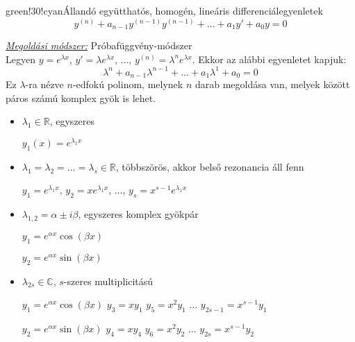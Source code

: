 \documentclass[main.tex]{subfiles}
\begin{document}
\begin{cbox}{green!30!cyan}{Állandó együtthatós, homogén, lineáris differenciálegyenletek}
  \[
    y^{(n)}
    + a_{n-1} y^{(n-1)} y^{(n-1)}
    + \dots
    + a_1 y'
    + a_0 y
    = 0
  \]

  \emph{\underline{Megoldási módszer:}} \quad Próbafüggvény-módszer
  \\[2mm]
  Legyen $y = e^{\lambda x}$, $y' = \lambda e^{\lambda x}$,
  $\dots$, $y^{(n)} = \lambda^n e^{\lambda x}$. Ekkor az
  alábbi egyenletet kapjuk:
  \[
    \lambda^n
    + a_{n-1} \lambda^{n-1}
    + \dots
    + a_{1} \lambda^{1}
    + a_{0}
    = 0
  \]
  Ez $\lambda$-ra nézve $n$-edfokú polinom, melynek
  $n$ darab megoldása van, melyek között páros számú
  komplex gyök is lehet.
  \begin{itemize}
    \item $\lambda_1 \in \mathbb{R}$, egyszeres

          $y_1(x) = e^{\lambda_1 x}$

    \item $\lambda_1 = \lambda_2 = \dots = \lambda_s \in \mathbb{R}$,
          többszörös, akkor belső rezonancia áll fenn

          $y_1 = e^{\lambda_1 x}$,
          $y_2 = x e^{\lambda_1 x}$,
          $\dots$,
          $y_s = x^{s-1} e^{\lambda_1 x}$

    \item $\lambda_{1,2} = \alpha \pm i\beta$, egyszeres komplex gyökpár

          $y_1 = e^{\alpha x} \cos (\beta x)$

          $y_2 = e^{\alpha x} \sin (\beta x)$

    \item $\lambda_{2s} \in \mathbb{C}$, $s$-szeres multiplicitású

          $y_1 = e^{\alpha x} \cos (\beta x)$
          \tabto{4cm}
          $y_3 = x y_1$
          \tabto{7cm}
          $y_5 = x^2 y_1$
          \tabto{10cm}
          $\dots$
          \tabto{11.5cm}
          $y_{2s-1} = x^{s-1} y_1$

          $y_2 = e^{\alpha x} \sin (\beta x)$
          \tabto{4cm}
          $y_4 = x y_4$
          \tabto{7cm}
          $y_6 = x^2 y_2$
          \tabto{10cm}
          $\dots$
          \tabto{11.5cm}
          $y_{2s} = x^{s-1} y_2$
  \end{itemize}
\end{cbox}
\end{document}
